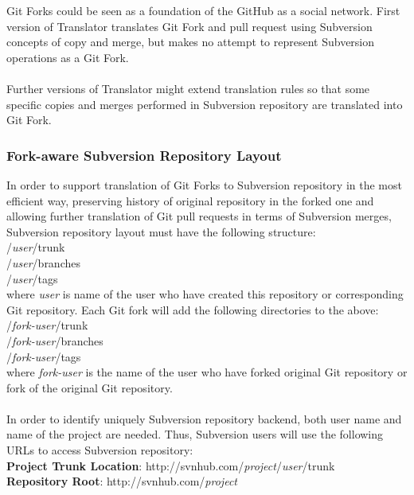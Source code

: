 Git Forks could be seen as a foundation of the GitHub as a social network. 
First version of Translator translates Git Fork and pull request using Subversion concepts of copy and merge,
but makes no attempt to represent Subversion operations as a Git Fork.\\\\
Further versions of Translator might extend translation
rules so that some specific copies and merges performed in Subversion repository are translated into Git Fork.

\subsubsection{Fork-aware Subversion Repository Layout}

In order to support translation of Git Forks to Subversion repository in the most efficient way, 
preserving history of original repository in the forked one and allowing further translation of
Git pull requests in terms of Subversion merges, 
Subversion repository layout must have the following structure:\\

/\emph{user}/trunk\\
/\emph{user}/branches\\
/\emph{user}/tags\\

where \emph{user} is name of the user who have created this repository or 
corresponding Git repository. Each Git fork will add the following directories to the above:\\

/\emph{fork-user}/trunk\\
/\emph{fork-user}/branches\\
/\emph{fork-user}/tags\\

where \emph{fork-user} is the name of the user who have forked original Git repository or fork of the original Git repository.
\\\\
In order to identify uniquely Subversion repository backend, both user name and name of the project are needed. Thus,
Subversion users will use the following URLs to access Subversion repository:\\

\textbf{Project Trunk Location}: http://svnhub.com/\emph{project}/\emph{user}/trunk\\
\textbf{Repository Root}: http://svnhub.com/\emph{project}\\

